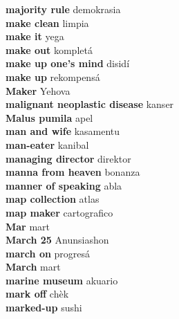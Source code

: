 \textbf{ majority rule  } demokrasia \\
\textbf{ make clean  } limpia \\
\textbf{ make it  } yega \\
\textbf{ make out  } kompletá \\
\textbf{ make up one’s mind  } disidí \\
\textbf{ make up  } rekompensá \\
\textbf{ Maker  } Yehova \\
\textbf{ malignant neoplastic disease  } kanser \\
\textbf{ Malus pumila  } apel \\
\textbf{ man and wife  } kasamentu \\
\textbf{ man-eater  } kanibal \\
\textbf{ managing director  } direktor \\
\textbf{ manna from heaven  } bonanza \\
\textbf{ manner of speaking  } abla \\
\textbf{ map collection  } atlas \\
\textbf{ map maker  } cartografico \\
\textbf{ Mar  } mart \\
\textbf{ March 25  } Anunsiashon \\
\textbf{ march on  } progresá \\
\textbf{ March  } mart \\
\textbf{ marine museum  } akuario \\
\textbf{ mark off  } chèk \\
\textbf{ marked-up  } sushi \\
